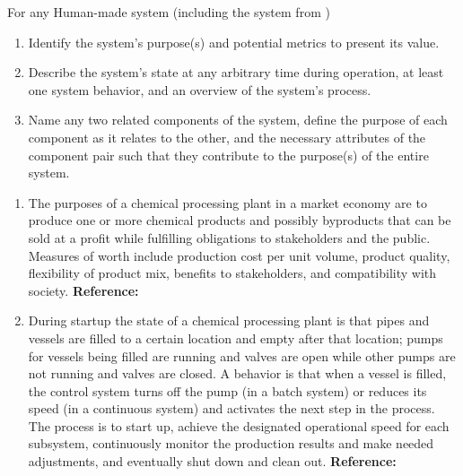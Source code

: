 \begin{exercises}
    \begin{exercise} 
    \label{sea-1-10_11_12}
        For any Human-made system (including the system from )
        \begin{enumerate}[label=\alph*)]
            \item Identify the system's purpose(s) and potential metrics to present its value.
            \item Describe the system's state at any arbitrary time during operation, at least one system behavior, and an overview of the system's process.
            \item Name any two related components of the system, define the purpose of each component as it relates to the other, and the necessary attributes of the component pair such that they contribute to the purpose(s) of the entire system.
        \end{enumerate}
    \end{exercise}
    \begin{solution}
        \begin{enumerate}[label=\alph*)]
            \item The purposes of a chemical processing plant in a market economy are to produce one or more chemical products and possibly byproducts that can be sold at a profit while fulfilling obligations to stakeholders and the public. Measures of worth include production cost per unit volume, product quality, flexibility of product mix, benefits to stakeholders, and compatibility with society. \textbf{Reference:}
            \item During startup the state of a chemical processing plant is that pipes and vessels are filled to a certain location and empty after that location; pumps for vessels being filled are running and valves are open while other pumps are not running and valves are closed. A behavior is that when a vessel is filled, the control system turns off the pump (in a batch system) or reduces its speed (in a continuous system) and activates the next step in the process. The process is to start up, achieve the designated operational speed for each subsystem, continuously monitor the production results and make needed adjustments, and eventually shut down and clean out. \textbf{Reference:}

\end{enumerate}
\end{solution}
\end{exercises}
